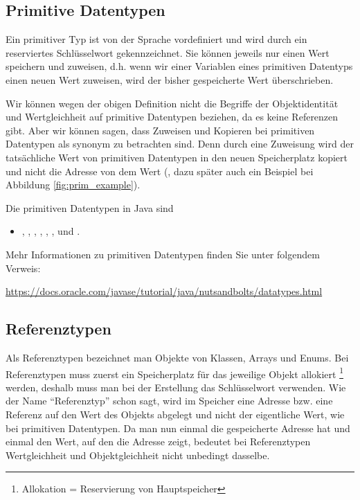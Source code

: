 \documentclass{tuda-pub}
\begin{document}
  \subsection{Primitive Datentypen}
  Ein primitiver Typ ist von der Sprache vordefiniert und wird durch ein reserviertes
  Schlüsselwort gekennzeichnet. Sie können jeweils nur einen Wert speichern und zuweisen, d.h.
  wenn wir einer Variablen eines primitiven Datentyps einen neuen Wert zuweisen, wird der bisher
  gespeicherte Wert überschrieben.

  \br
  Wir können wegen der obigen Definition nicht die Begriffe der Objektidentität und
  Wertgleichheit auf primitive Datentypen beziehen, da es keine Referenzen gibt. Aber wir können
  sagen, dass Zuweisen und Kopieren bei primitiven Datentypen als synonym zu betrachten sind.
  Denn durch eine Zuweisung wird der tatsächliche Wert von primitiven Datentypen in den neuen
  Speicherplatz kopiert und nicht die Adresse von dem Wert (, dazu später auch ein Beispiel bei
  Abbildung \ref{fig:prim_example}).

  \br

  Die primitiven Datentypen in Java sind

  \begin{itemize}
    \item {}, , , ,
    , ,  und .
  \end{itemize}

  \begin{note}[title=Information:]
    Mehr Informationen zu primitiven Datentypen finden Sie unter folgendem Verweis:

    \begin{center}
      \url{https://docs.oracle.com/javase/tutorial/java/nutsandbolts/datatypes.html}
    \end{center}
  \end{note}

  \subsection{Referenztypen}
  \label{sec:Referenztypen}
  Als Referenztypen bezeichnet man Objekte von Klassen, Arrays und Enums. Bei Referenztypen muss
  zuerst ein Speicherplatz für das jeweilige Objekt allokiert \footnote{Allokation = Reservierung
  von Hauptspeicher} werden, deshalb muss man bei der Erstellung das Schlüsselwort
   verwenden. Wie der Name \enquote{Referenztyp} schon sagt, wird im Speicher
  eine Adresse bzw. eine Referenz auf den Wert des Objekts abgelegt und nicht der eigentliche
  Wert, wie bei primitiven Datentypen. Da man nun einmal die gespeicherte Adresse hat und einmal
  den Wert, auf den die Adresse zeigt, bedeutet bei Referenztypen Wertgleichheit und
  Objektgleichheit nicht unbedingt dasselbe.
\end{document}
